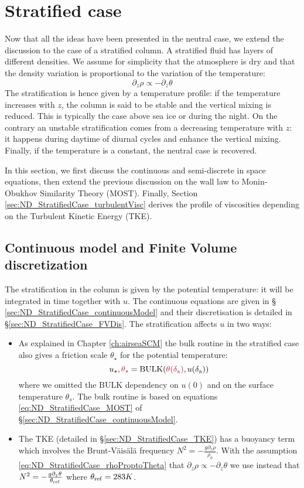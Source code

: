 \section{Stratified case}
\label{sec:ND_StratifiedCase}
Now that all the ideas have been presented in the neutral case,
we extend the discussion to the case of a stratified column.
A stratified fluid has layers of different densities.
We assume for simplicity that the atmosphere
is dry and that the density variation is
proportional to the variation of the temperature:
\begin{equation}
	\label{eq:ND_StratifiedCase_rhoProptoTheta}
	\partial_z \rho \propto
	- \partial_z \theta
\end{equation}
The stratification is hence given by a temperature profile:
if the temperature increases with $z$, the column is said
to be stable and the vertical mixing is reduced. This is
typically the case above sea ice or during the night.
On the contrary an unstable stratification comes from
a decreasing temperature with $z$: it happens
during daytime of diurnal cycles and enhance the
vertical mixing.
%
Finally, if the temperature is a constant, the neutral case is
recovered.
\par
In this section, we first discuss the continuous and semi-discrete in space
equations, then extend the previous discussion on the wall law to
Monin-Obukhov Similarity Theory (MOST).
Finally, Section \ref{sec:ND_StratifiedCase_turbulentVisc} derives the
profile of viscosities depending on the Turbulent Kinetic Energy
(TKE).
\subsection{Continuous model and Finite Volume discretization}
The stratification in the column is given by the
potential temperature: it will be integrated in time
together with $u$.
The continuous equations are given in \S
\ref{sec:ND_StratifiedCase_continuousModel}
and their discretisation is detailed in
\S \ref{sec:ND_StratifiedCase_FVDis}.
The stratification affects $u$
in two ways:
\begin{itemize}
	\item
As explained in Chapter \ref{ch:airseaSCM}
the bulk routine in the stratified case
also gives a friction scale $\theta_\star$
for the potential temperature:
\begin{equation}
	u_\star, \emphase{\theta_\star} =
	{\rm BULK}(\emphase{\theta(\delta_{\rm a})},
	u(\delta_{\rm a}))
\end{equation}
where we omitted the BULK dependency on
$u(0)$ and on the surface temperature $\theta_s$.
The bulk routine is based on equations
\eqref{eq:ND_StratifiedCase_MOST} of
\S \ref{sec:ND_StratifiedCase_continuousModel}.
\item The TKE (detailed in \S \ref{sec:ND_StratifiedCase_TKE})
	has a buoyancy term which involves the Brunt-Väisälä frequency
	$N^2 = - \frac{g\partial_z \rho}{\rho_0}$.
	With the assumption
	\eqref{eq:ND_StratifiedCase_rhoProptoTheta}
	that $ \partial_z \rho \propto - \partial_z \theta$
	we use instead that $N^2 = - \frac{g\partial_z \theta}
	{\theta_{\rm ref}}$ where $\theta_{\rm ref}=283K$.
\end{itemize}
